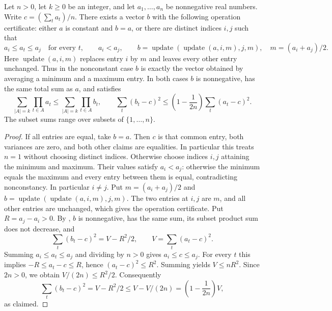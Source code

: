 \begin{lemma}
Let $n>0$, let $k\ge0$ be an integer, and let $a_1,\ldots,a_n$ be
nonnegative real numbers. Write $c=(\sum_t a_t)/n$. There exists a
vector $b$ with the following operation certificate: either $a$ is
constant and $b=a$, or there are distinct indices $i,j$ such that
\[
 a_i\le a_t\le a_j\quad\text{for every }t,\qquad a_i<a_j,
 \qquad
 b=\operatorname{update}(\operatorname{update}(a,i,m),j,m),
 \quad m=(a_i+a_j)/2.
\]
Here $\operatorname{update}(a,i,m)$ replaces entry $i$ by $m$ and
leaves every other entry unchanged. Thus in the nonconstant case $b$
is exactly the vector obtained by averaging a minimum and a maximum
entry. In both cases $b$ is nonnegative, has the same total sum as $a$,
and satisfies
\[
 \sum_{|A|=k}\prod_{t\in A}a_t
 \le \sum_{|A|=k}\prod_{t\in A}b_t,
 \qquad
 \sum_t(b_t-c)^2\le\left(1-\frac1{2n}\right)\sum_t(a_t-c)^2.
\]
The subset sums range over subsets of $\{1,\ldots,n\}$.
\end{lemma}
\begin{proof}
If all entries are equal, take $b=a$. Then $c$ is that common entry,
both variances are zero, and both other claims are equalities. In
particular this treats $n=1$ without choosing distinct indices.
Otherwise choose indices $i,j$ attaining the minimum and maximum.
Their values satisfy $a_i<a_j$: otherwise the minimum equals the
maximum and every entry between them is equal, contradicting
nonconstancy. In particular $i\ne j$. Put $m=(a_i+a_j)/2$ and
$b=\operatorname{update}(\operatorname{update}(a,i,m),j,m)$.
The two entries at $i,j$ are $m$, and all other entries are unchanged,
which gives the operation certificate. Put $R=a_j-a_i>0$. By
, $b$ is nonnegative, has the
same sum, its subset product sum does not decrease, and
\[
 \sum_t(b_t-c)^2=V-R^2/2,
 \qquad V=\sum_t(a_t-c)^2.
\]
Summing $a_i\le a_t\le a_j$ and dividing by $n>0$ gives
$a_i\le c\le a_j$. For every $t$ this implies
$-R\le a_t-c\le R$, hence $(a_t-c)^2\le R^2$.
Summing yields $V\le nR^2$. Since $2n>0$, we obtain
$V/(2n)\le R^2/2$. Consequently
\[
 \sum_t(b_t-c)^2=V-R^2/2
 \le V-V/(2n)=\left(1-\frac1{2n}\right)V,
\]
as claimed.
\end{proof}
